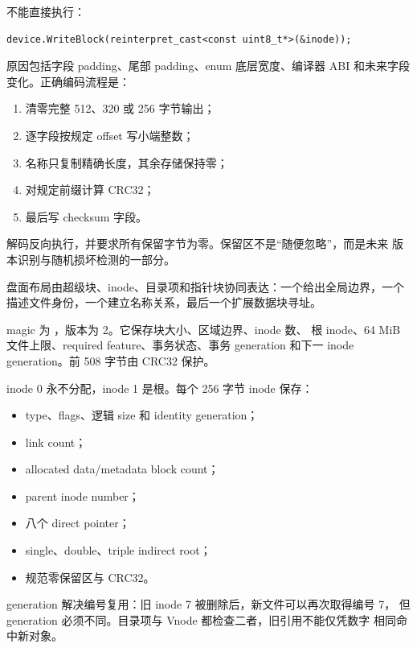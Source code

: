 不能直接执行：

\begin{lstlisting}[caption={禁止把内存对象布局冒充盘面格式}]
device.WriteBlock(reinterpret_cast<const uint8_t*>(&inode));
\end{lstlisting}

原因包括字段 padding、尾部 padding、enum 底层宽度、编译器 ABI 和未来字段
变化。正确编码流程是：

\begin{enumerate}
  \item 清零完整 512、320 或 256 字节输出；
  \item 逐字段按规定 offset 写小端整数；
  \item 名称只复制精确长度，其余存储保持零；
  \item 对规定前缀计算 CRC32；
  \item 最后写 checksum 字段。
\end{enumerate}

解码反向执行，并要求所有保留字节为零。保留区不是“随便忽略”，而是未来
版本识别与随机损坏检测的一部分。

盘面布局由超级块、inode、目录项和指针块协同表达：一个给出全局边界，一个
描述文件身份，一个建立名称关系，最后一个扩展数据块寻址。


magic 为 ，版本为 2。它保存块大小、区域边界、inode 数、
根 inode、64 MiB 文件上限、required feature、事务状态、事务 generation
和下一 inode generation。前 508 字节由 CRC32 保护。


inode 0 永不分配，inode 1 是根。每个 256 字节 inode 保存：

\begin{itemize}
  \item type、flags、逻辑 size 和 identity generation；
  \item link count；
  \item allocated data/metadata block count；
  \item parent inode number；
  \item 八个 direct pointer；
  \item single、double、triple indirect root；
  \item 规范零保留区与 CRC32。
\end{itemize}

generation 解决编号复用：旧 inode 7 被删除后，新文件可以再次取得编号 7，
但 generation 必须不同。目录项与 Vnode 都检查二者，旧引用不能仅凭数字
相同命中新对象。

